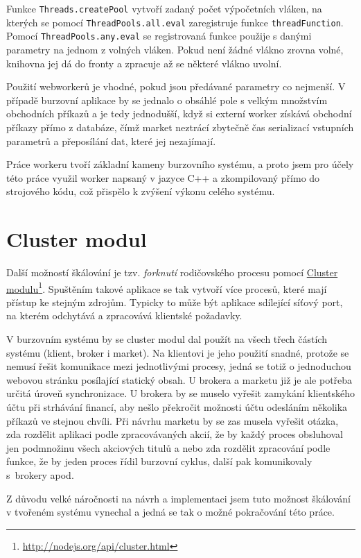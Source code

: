 \documentclass[thesis=M,czech]{FITthesis}[2012/06/26]
\newcommand\fnurl[2]{\href{#2}{#1}\footnote{\url{#2}}}
\begin{document}
	Funkce \texttt{Threads.createPool} vytvoří zadaný počet výpočetních vláken, na kterých se pomocí \texttt{ThreadPools.all.eval} zaregistruje funkce \texttt{threadFunction}. Pomocí \texttt{ThreadPools.any.eval} se registrovaná funkce použije s danými parametry na jednom z volných vláken. Pokud není žádné vlákno zrovna volné, knihovna jej dá do fronty a zpracuje až se některé vlákno uvolní.
	
	Použití webworkerů je vhodné, pokud jsou předávané parametry co nejmenší. V případě burzovní aplikace by se jednalo o obsáhlé pole s velkým množstvím obchodních příkazů a je tedy jednodušší, když si externí worker získává obchodní příkazy přímo z databáze, čímž market neztrácí zbytečně čas serializací vstupních parametrů a přeposílání dat, které jej nezajímají.
	
	Práce workeru tvoří základní kameny burzovního systému, a proto jsem pro účely této práce využil worker napsaný v jazyce C++ a zkompilovaný přímo do strojového kódu, což přispělo k zvýšení výkonu celého systému.
	

\section{Cluster modul}

	Další možností škálování je tzv. \textit{forknutí} rodičovského procesu pomocí \fnurl{Cluster modulu}{http://nodejs.org/api/cluster.html}. Spuštěním takové aplikace se tak vytvoří více procesů, které mají přístup ke stejným zdrojům. Typicky to může být aplikace sdílející síťový port, na kterém odchytává a zpracovává klientské požadavky.
	
	V burzovním systému by se cluster modul dal použít na všech třech částích systému (klient, broker i market). Na klientovi je jeho použití snadné, protože se nemusí řešit komunikace mezi jednotlivými procesy, jedná se totiž o jednoduchou webovou stránku posílající statický obsah. U brokera a marketu již je ale potřeba určitá úroveň synchronizace. U brokera by se muselo vyřešit zamykání klientského účtu při strhávání financí, aby nešlo překročit možnosti účtu odesláním několika příkazů ve stejnou chvíli. Při návrhu marketu by se zas musela vyřešit otázka, zda rozdělit aplikaci podle zpracovávaných akcií, že by každý proces obsluhoval jen podmnožinu všech akciových titulů a nebo zda rozdělit zpracování podle funkce, že by jeden proces řídil burzovní cyklus, další pak komunikovaly s~brokery apod.

	Z důvodu velké náročnosti na návrh a implementaci jsem tuto možnost škálování v tvořeném systému vynechal a jedná se tak o možné pokračování této práce.
\end{document}
